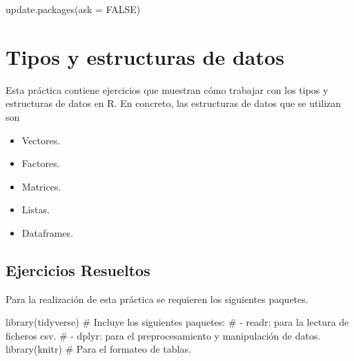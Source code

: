 \documentclass[
  a4paper,
]{scrreport}
\newenvironment{Shaded}{\begin{snugshade}}{\end{snugshade}}
\newcommand{\AttributeTok}[1]{\textcolor[rgb]{0.40,0.45,0.13}{#1}}
\newcommand{\CommentTok}[1]{\textcolor[rgb]{0.37,0.37,0.37}{#1}}
\newcommand{\ConstantTok}[1]{\textcolor[rgb]{0.56,0.35,0.01}{#1}}
\newcommand{\FunctionTok}[1]{\textcolor[rgb]{0.28,0.35,0.67}{#1}}
\newcommand{\NormalTok}[1]{\textcolor[rgb]{0.00,0.23,0.31}{#1}}
\providecommand{\tightlist}{%
  \setlength{\itemsep}{0pt}\setlength{\parskip}{0pt}}\usepackage{longtable,booktabs,array}
\theoremstyle{definition}
\theoremstyle{remark}
\begin{document}
\begin{Shaded}
\begin{Highlighting}[]
\FunctionTok{update.packages}\NormalTok{(}\AttributeTok{ask =} \ConstantTok{FALSE}\NormalTok{)}
\end{Highlighting}
\end{Shaded}


\chapter{Tipos y estructuras de
datos}\label{tipos-y-estructuras-de-datos}

Esta práctica contiene ejercicios que muestran cómo trabajar con los
tipos y estructuras de datos en R. En concreto, las estructuras de datos
que se utilizan son

\begin{itemize}
\tightlist
\item
  Vectores.
\item
  Factores.
\item
  Matrices.
\item
  Listas.
\item
  Dataframes.
\end{itemize}

\section{Ejercicios Resueltos}\label{ejercicios-resueltos}

Para la realización de esta práctica se requieren los siguientes
paquetes.

\begin{Shaded}
\begin{Highlighting}[]
\FunctionTok{library}\NormalTok{(tidyverse) }
\CommentTok{\# Incluye los siguientes paquetes:}
\CommentTok{\# {-} readr: para la lectura de ficheros csv. }
\CommentTok{\# {-} dplyr: para el preprocesamiento y manipulación de datos.}
\FunctionTok{library}\NormalTok{(knitr) }\CommentTok{\# Para el formateo de tablas.}
\end{Highlighting}
\end{Shaded}
\end{document}
